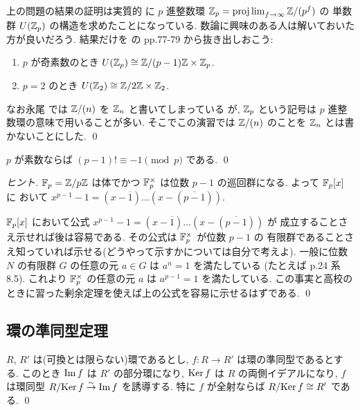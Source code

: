 \documentclass[12pt,twoside]{jarticle}
\begin{document}
\begin{guide}
 上の問題の結果の証明は実質的
 に $p$ 進整数環 ${\mathbb Z}_p=\mathop{\mathrm{proj}\,\mathrm{lim}}_{f\to\infty} {\mathbb Z}/(p^f)$ の
 単数群 $U({\mathbb Z}_p)$ の構造を求めたことになっている.
 数論に興味のある人は解いておいた方が良いだろう.
 結果だけを \cite{suron-1} の pp.77-79 から抜き出しおこう:
\begin{enumerate}
 \item $p$ が奇素数のとき $U({\mathbb Z}_p) \cong {\mathbb Z}/(p-1){\mathbb Z}\times{\mathbb Z}_p$.
 \item $p=2$ のとき $U({\mathbb Z}_2) \cong {\mathbb Z}/2{\mathbb Z}\times{\mathbb Z}_2$.
\end{enumerate}

 なお永尾 \cite{nagao-1983} では ${\mathbb Z}/(n)$ を ${\mathbb Z}_n$ と書いてしまっている
 が, ${\mathbb Z}_p$ という記号は $p$ 進整数環の意味で用いることが多い. 
 そこでこの演習では ${\mathbb Z}/(n)$ のことを ${\mathbb Z}_n$ とは書かないことにした.
 \qed
\end{guide}

\begin{question}
\label{q:Wilson-theorem}
 $p$ が素数ならば $(p-1)!\equiv -1 \pmod p$ である. \qed
\end{question}

\begin{proof}[ヒント]
 ${\mathbb F}_p={\mathbb Z}/p{\mathbb Z}$ は体でかつ ${\mathbb F}_p^\times$ は位数 $p-1$ の巡回群になる.
 よって ${\mathbb F}_p[x]$ に
 おいて $x^{p-1}-1=(x-\overline{1})\dots(x-(\overline{p-1}))$.

 ${\mathbb F}_p[x]$ において公式 $x^{p-1}-1=(x-\overline{1})\dots(x-(\overline{p-1}))$ が
 成立することさえ示せれば後は容易である. その公式は ${\mathbb F}_p^\times$ が位数 $p-1$ の
 有限群であることさえ知っていれば示せる(どうやって示すかについては自分で考えよ). 
 一般に位数 $N$ の有限群 $G$ の任意の元 $a\in G$ は $a^n=1$ を満たしている
 (たとえば \cite{nagao-1983} p.24 系8.5).
 これより ${\mathbb F}_p^\times$ の任意の元 $a$ は $a^{p-1}=1$ を満たしている.
 この事実と高校のときに習った剰余定理を使えば上の公式を容易に示せるはずである.
 \qed
\end{proof}


\subsection{環の準同型定理}

\begin{question}[環の準同型定理]
 \label{q:ring-hom-th-1}
 $R$, $R'$ は(可換とは限らない)環であるとし, 
 $f:R\to R'$ は環の準同型であるとする.
 このとき $\mathop{\mathrm{Im}}\nolimits f$ は $R'$ の部分環になり, 
 $\mathop{\mathrm{Ker}}\nolimits f$ は $R$ の両側イデアルになり, 
 $f$ は環同型 $R/\!\mathop{\mathrm{Ker}}\nolimits f\overset\sim\rightarrow \mathop{\mathrm{Im}}\nolimits f$ を誘導する.
 特に $f$ が全射ならば $R/\!\mathop{\mathrm{Ker}}\nolimits f\cong R'$ である.
 \qed
\end{question}
\end{document}
